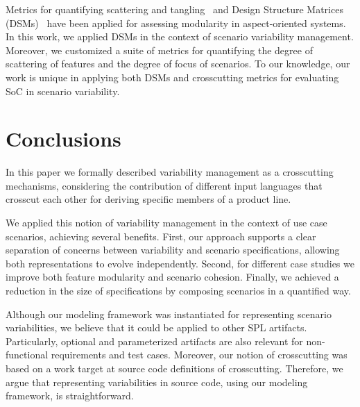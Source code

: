 \documentclass{acm_proc_article-sp}
\begin{document}
Metrics for quantifying scattering and tangling~\cite{Eaddy:2007aa,Figueiredo:2008aa} and
Design Structure Matrices (DSMs)~\cite{Sullivan:2005aa,Lopes:2006aa}
have been applied for assessing modularity in aspect-oriented
systems. In this work, we applied
DSMs in the context of scenario variability management.
Moreover, we customized a suite of metrics for quantifying
the degree of scattering of features and the degree of focus of scenarios.
To our knowledge, our work is unique in applying both DSMs and crosscutting metrics for evaluating SoC in scenario variability.


\section{Conclusions}\label{sec:conclusions}

In this paper we formally described variability management as a
crosscutting mechanisms, considering the contribution
of different input languages that crosscut each other for deriving
specific members of a product line.

We applied this notion of variability management in the context of use
case scenarios, achieving several benefits. 
First, our approach supports
a clear separation of concerns between variability and scenario specifications,
allowing both representations to evolve independently. Second, for different case studies we improve both feature modularity and scenario cohesion. Finally, we achieved a reduction in the size of specifications by composing scenarios in a quantified way. 

Although our modeling framework was instantiated for representing
scenario variabilities, we believe that it could be applied to
other SPL artifacts. Particularly, optional and parameterized artifacts
are also relevant for non-functional requirements and test cases.
Moreover, our notion of crosscutting was based on a work target at source code definitions of crosscutting. Therefore,
we argue that representing variabilities in source code, using our modeling framework,
is straightforward.

\end{document}
